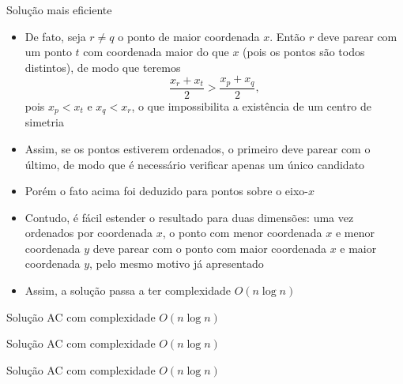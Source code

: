 \begin{frame}[fragile]{Solução mais eficiente}

    \begin{itemize}
        \item De fato, seja $r \neq q$ o ponto de maior coordenada $x$. Então $r$ deve parear
            com um ponto $t$ com coordenada maior do que $x$ (pois os pontos são todos
            distintos), de modo que teremos
        \[
            \frac{x_r + x_t}{2} > \frac{x_p + x_q}{2},
        \]
        pois $x_p < x_t$ e $x_q < x_r$, o que impossibilita a existência de um centro de simetria
        \pause

        \item Assim, se os pontos estiverem ordenados, o primeiro deve parear com o último, de modo
            que é necessário verificar apenas um único candidato
        \pause

        \item Porém o fato acima foi deduzido para pontos sobre o eixo-$x$
        \pause

        \item Contudo, é fácil estender o resultado para duas dimensões: uma vez ordenados por
            coordenada $x$, o ponto com menor coordenada $x$ e menor coordenada $y$ deve parear
            com o ponto com maior coordenada $x$ e maior coordenada $y$, pelo mesmo motivo
            já apresentado
        \pause

        \item Assim, a solução passa a ter complexidade $O(n\log  n)$
    \end{itemize}

\end{frame}

\begin{frame}[fragile]{Solução AC com complexidade $O(n\log n)$}
\end{frame}

\begin{frame}[fragile]{Solução AC com complexidade $O(n\log n)$}
\end{frame}

\begin{frame}[fragile]{Solução AC com complexidade $O(n\log n)$}
\end{frame}






